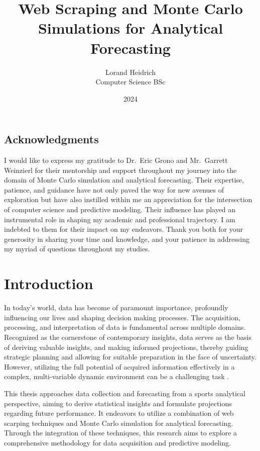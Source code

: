 \documentclass{thesis-ekf}
\institute{Institute of Mathematics and Informatics}
\title{Web Scraping and Monte Carlo Simulations for Analytical Forecasting}
\author{Lorand Heidrich\\ Computer Science BSc}
\date{2024}
\theoremstyle{definition}
\theoremstyle{remark}
\begin{document}
\maketitle


\clearpage
\section*{Acknowledgments}
\thispagestyle{empty} 
I would like to express my gratitude to Dr.~Eric Grono and Mr.~Garrett Weinzierl for their mentorship and support throughout my journey into the domain of Monte Carlo simulation and analytical forecasting. Their expertise, patience, and guidance have not only paved the way for new avenues of exploration but have also instilled within me an appreciation for the intersection of computer science and predictive modeling.
\newline\newline
\noindent Their influence has played an instrumental role in shaping my academic and professional trajectory. I am indebted to them for their impact on my endeavors.
\newline\newline
\noindent Thank you both for your generosity in sharing your time and knowledge, and your patience in addressing my myriad of questions throughout my studies. 


\tableofcontents


\chapter{Introduction}
In today’s world, data has become of paramount importance, profoundly influencing our lives and shaping decision making processes. The acquisition, processing, and interpretation of data is fundamental across multiple domains. \cite{Mondaut} Recognized as the cornerstone of contemporary insights, data serves as the basis of deriving valuable insights, and making informed projections, thereby guiding strategic planning and allowing for suitable preparation in the face of uncertainty. However, utilizing the full potential of acquired information effectively in a complex, multi-variable dynamic environment can be a challenging task \cite{Kornwitz}.

This thesis approaches data collection and forecasting from a sports analytical perspective, aiming to derive statistical insights and formulate projections regarding future performance. It endeavors to utilize a combination of web scarping techniques \cite{Khder} and Monte Carlo simulation \cite{Aderibigbe} for analytical forecasting. Through the integration of these techniques, this research aims to explore a comprehensive methodology for data acquisition and predictive modeling.
\end{document}
